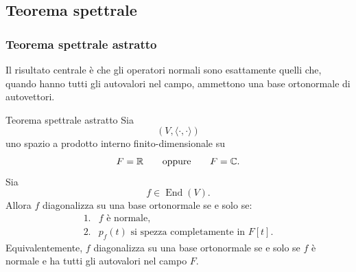 \documentclass[a4paper]{article}
\begin{document}
\subsection{Teorema spettrale}

\subsubsection{Teorema spettrale astratto}

Il risultato centrale è che gli operatori normali sono esattamente quelli che, quando hanno tutti gli autovalori nel campo, ammettono una base ortonormale di autovettori.

\begin{snippettheorem}{Teorema spettrale astratto}
    Sia
    \[
        (V,\langle\cdot,\cdot\rangle)
    \]
    uno spazio a prodotto interno finito-dimensionale su
    \[
        F=\mathbb{R}
        \qquad
        \text{oppure}
        \qquad
        F=\mathbb{C}.
    \]
    Sia
    \[
        f\in\operatorname{End}(V).
    \]
    Allora \(f\) diagonalizza su una base ortonormale se e solo se:
    \[
        \begin{array}{ll}
            \text{1.} & f \text{ è normale},\\[1mm]
            \text{2.} & p_f(t) \text{ si spezza completamente in } F[t].
        \end{array}
    \]
    Equivalentemente, \(f\) diagonalizza su una base ortonormale se e solo se \(f\) è normale e ha tutti gli autovalori nel campo \(F\).
\end{snippettheorem}
\end{document}
